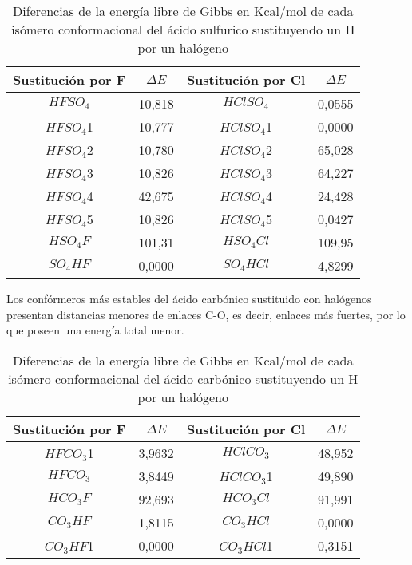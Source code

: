 \begin{table}[H]
	\begin{center}
		\begin{tabular}{|c|c|c|c|}
			\hline
			Sustitución por F & $\Delta E$ & Sustitución por Cl & $\Delta E$ \\ \hline
			$HFSO_4$	& 10,818 & $HClSO_4$ & 0,0555 \\ \hline
			$HFSO_4$1 & 10,777 & $HClSO_4$1 & 0,0000 \\ \hline
			$HFSO_4$2 & 10,780 & $HClSO_4$2 & 65,028 \\ \hline
			$HFSO_4$3 & 10,826 & $HClSO_4$3 & 64,227 \\ \hline
			$HFSO_4$4 & 42,675 & $HClSO_4$4 & 24,428 \\ \hline
			$HFSO_4$5 & 10,826 & $HClSO_4$5 & 0,0427 \\ \hline
			$HSO_4F$ &	101,31 & $HSO_4Cl$ & 109,95 \\ \hline
			$SO_4HF$ &	0,0000 & $SO_4HCl$ & 4,8299 \\ \hline
		\end{tabular}
		\caption{Diferencias de la energía libre de Gibbs en Kcal/mol de cada isómero conformacional del ácido sulfurico sustituyendo un H por un halógeno}
	\end{center}
\end{table}

Los confórmeros más estables del ácido carbónico sustituido con halógenos presentan distancias menores de enlaces C-O, es decir, enlaces más fuertes, por lo que poseen una energía total menor.

\begin{table}[H]
	\begin{center}
		\begin{tabular}{|c|c|c|c|}
			\hline 
			Sustitución por F & $\Delta E$ & Sustitución por Cl & $\Delta E$ \\ \hline
			$HFCO_3$1 & 3,9632 & $HClCO_3$ & 48,952 \\ \hline
			$HFCO_3$ & 3,8449 & $HClCO_3$1 & 49,890 \\ \hline
			$HCO_3F$ & 92,693 & $HCO_3Cl$ & 91,991 \\ \hline
			$CO_3HF$ & 1,8115 & $CO_3HCl$ & 0,0000 \\ \hline
			$CO_3HF$1 & 0,0000 & $CO_3HCl$1 & 0,3151 \\ \hline
		\end{tabular}
		\caption{Diferencias de la energía libre de Gibbs en Kcal/mol de cada isómero conformacional del ácido carbónico sustituyendo un H por un halógeno}
	\end{center}
\end{table}

